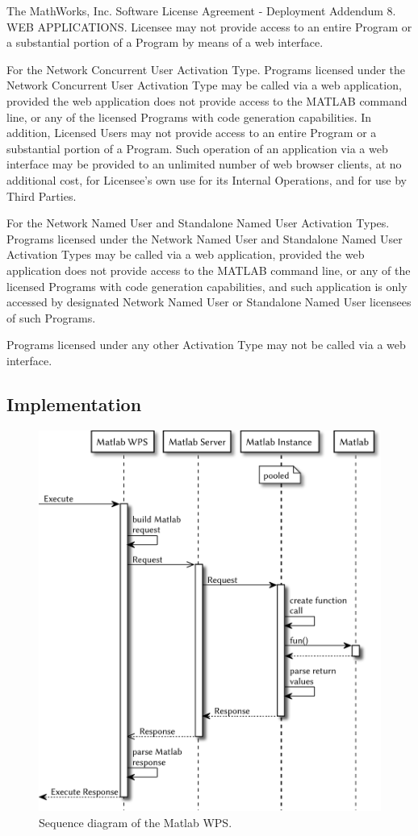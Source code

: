 		\begin{signedquote}{The MathWorks, Inc. Software License Agreement - Deployment Addendum}
			8. WEB APPLICATIONS.  Licensee may not provide access to an entire Program
			or a substantial portion of a Program by means of a web interface.

			For the Network Concurrent User Activation Type.  Programs licensed under the
			Network Concurrent User Activation Type may be called via a web application,
			provided the web application does not provide access to the MATLAB command
			line, or any of the licensed Programs with code generation capabilities.  In
			addition, Licensed Users may not provide access to an entire Program or a
			substantial portion of a Program.  Such operation of an application via a web
			interface may be provided to an unlimited number of web browser clients, at no
			additional cost, for Licensee's own use for its Internal Operations, and for
			use by Third Parties.

			For the Network Named User and Standalone Named User Activation Types.
			Programs licensed under the Network Named User and Standalone Named User
			Activation Types may be called via a web application, provided the web
			application does not provide access to the MATLAB command line, or any of the
			licensed Programs with code generation capabilities, and such application is
			only accessed by designated Network Named User or Standalone Named User
			licensees of such Programs.

			Programs licensed under any other Activation Type may not be called via a web
			interface.
		\end{signedquote}
		\subsection{Implementation}
		\begin{figure}[!htb]
			\centering
			\includegraphics[width=.8125\textwidth]{figures/sequence-diagramm-mwps.pdf}
			\caption{\label{fig:sd:mwps} Sequence diagram of the Matlab WPS.} %
		\end{figure}
